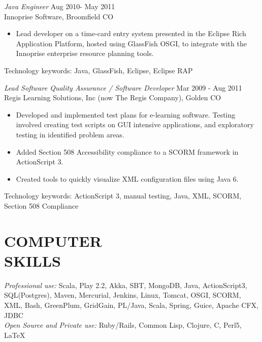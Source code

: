 \documentclass[line,margin]{res}
\begin{document}
\begin{resume}
 
                {\sl Java Engineer} \hfill          Aug 2010- May 2011 \\
                Innoprise Software, Broomfield CO
                 \begin{itemize} %
                 \item Lead developer on a time-card entry system presented in the Eclipse Rich Application Platform, hosted using GlassFish OSGI, to integrate with the
		Innoprise enterprise resource planning tools.
\end{itemize} 
	     Technology keywords: Java, GlassFish, Eclipse, Eclipse RAP
                

                {\sl Lead Software Quality Assurance / Software Developer} \hfill        Mar 2009 - Aug 2011 \\
                Regis Learning Solutions, Inc (now The Regis Company), Golden CO
                  \begin{itemize} %
                   \item Developed and implemented test plans for e-learning software. Testing involved creating test scripts on GUI intensive applications, and exploratory testing in identified problem areas.
		\item Added Section 508 Accessibility compliance to a SCORM framework in ActionScript 3.
		\item Created tools to quickly visualize XML configuration files using Java 6.   
    \end{itemize} 
		Technology keywords: ActionScript 3, manual testing, Java, XML, SCORM, Section 508 Compliance
            
 \section{COMPUTER \\ SKILLS} {\sl Professional use:} Scala, Play 2.2, Akka, SBT, MongoDB, Java, ActionScript3, SQL(Postgres), Maven, Mercurial, Jenkins, Linux, Tomcat, OSGI, SCORM, XML, Bash, GreenPlum, GridGain, PL/Java, Scala, Spring, Guice, Apache CFX, JDBC  \\
                {\sl Open Source and Private use:} Ruby/Rails, Common Lisp, Clojure, C, Perl5, \LaTeX \\



\end{resume}
\end{document}
